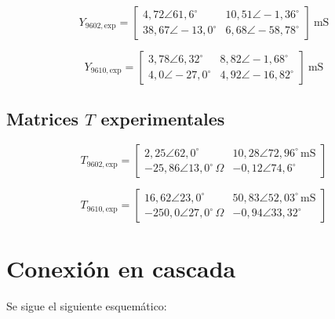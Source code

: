 \[
Y_{9602,\text{exp}} =
\begin{bmatrix}
4,72\angle 61,6^\circ & 10,51\angle -1,36^\circ \\
38,67\angle -13,0^\circ & 6,68\angle -58,78^\circ
\end{bmatrix}
\ \text{mS}
\]

\[
Y_{9610,\text{exp}} =
\begin{bmatrix}
3,78\angle 6,32^\circ & 8,82\angle -1,68^\circ \\
4,0\angle -27,0^\circ & 4,92\angle -16,82^\circ
\end{bmatrix}
\ \text{mS}
\]
\subsection{Matrices $T$ experimentales}

\[
T_{9602,\text{exp}} =
\begin{bmatrix}
2,25\angle 62{,}0^\circ & 10,28\angle 72,96^\circ\,\text{mS} \\
-25,86\angle 13,0^\circ\,\Omega & -0,12\angle 74,6^\circ
\end{bmatrix}
\]

\[
T_{9610,\text{exp}} =
\begin{bmatrix}
16,62\angle 23,0^\circ & 50,83\angle 52,03^\circ\,\text{mS} \\
-250,0\angle 27,0 ^\circ\,\Omega & -0,94\angle 33,32^\circ
\end{bmatrix}
\]

\section{Conexión en cascada}
Se sigue el siguiente esquemático:

